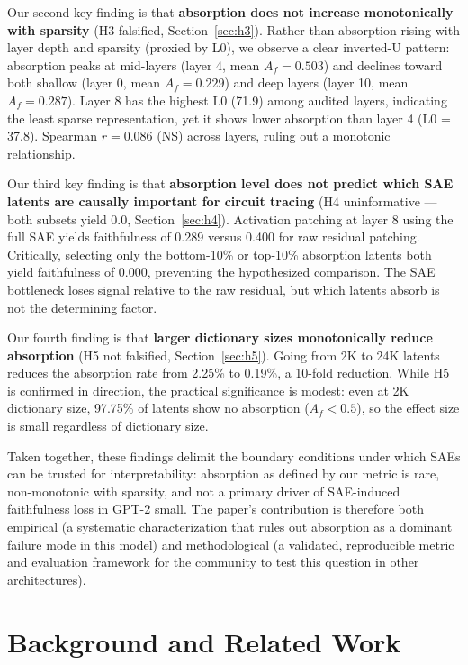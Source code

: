 \documentclass{article}
\begin{document}
Our second key finding is that \textbf{absorption does not increase monotonically with sparsity} (H3 falsified, Section~\ref{sec:h3}). Rather than absorption rising with layer depth and sparsity (proxied by L0), we observe a clear inverted-U pattern: absorption peaks at mid-layers (layer 4, mean $A_f = 0.503$) and declines toward both shallow (layer 0, mean $A_f = 0.229$) and deep layers (layer 10, mean $A_f = 0.287$). Layer 8 has the highest L0 (71.9) among audited layers, indicating the least sparse representation, yet it shows lower absorption than layer 4 (L0 = 37.8). Spearman $r = 0.086$ (NS) across layers, ruling out a monotonic relationship.

Our third key finding is that \textbf{absorption level does not predict which SAE latents are causally important for circuit tracing} (H4 uninformative --- both subsets yield 0.0, Section~\ref{sec:h4}). Activation patching at layer 8 using the full SAE yields faithfulness of 0.289 versus 0.400 for raw residual patching. Critically, selecting only the bottom-10\% or top-10\% absorption latents both yield faithfulness of 0.000, preventing the hypothesized comparison. The SAE bottleneck loses signal relative to the raw residual, but which latents absorb is not the determining factor.

Our fourth finding is that \textbf{larger dictionary sizes monotonically reduce absorption} (H5 not falsified, Section~\ref{sec:h5}). Going from 2K to 24K latents reduces the absorption rate from 2.25\% to 0.19\%, a 10-fold reduction. While H5 is confirmed in direction, the practical significance is modest: even at 2K dictionary size, 97.75\% of latents show no absorption ($A_f < 0.5$), so the effect size is small regardless of dictionary size.

Taken together, these findings delimit the boundary conditions under which SAEs can be trusted for interpretability: absorption as defined by our metric is rare, non-monotonic with sparsity, and not a primary driver of SAE-induced faithfulness loss in GPT-2 small. The paper's contribution is therefore both empirical (a systematic characterization that rules out absorption as a dominant failure mode in this model) and methodological (a validated, reproducible metric and evaluation framework for the community to test this question in other architectures).


\section{Background and Related Work}
\end{document}
